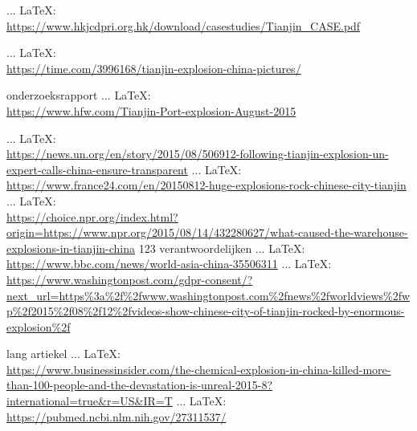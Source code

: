 \begin{thebibliography}{99}
     ... \LaTeX:\\ \url{https://www.hkjcdpri.org.hk/download/casestudies/Tianjin_CASE.pdf}

     ... \LaTeX:\\ \url{https://time.com/3996168/tianjin-explosion-china-pictures/}

    onderzoeksrapport
     ... \LaTeX:\\ \url{https://www.hfw.com/Tianjin-Port-explosion-August-2015}

     ... \LaTeX:\\ \url{https://news.un.org/en/story/2015/08/506912-following-tianjin-explosion-un-expert-calls-china-ensure-transparent}
     ... \LaTeX:\\ \url{https://www.france24.com/en/20150812-huge-explosions-rock-chinese-city-tianjin}
     ... \LaTeX:\\ \url{https://choice.npr.org/index.html?origin=https://www.npr.org/2015/08/14/432280627/what-caused-the-warehouse-explosions-in-tianjin-china}
    123 verantwoordelijken
     ... \LaTeX:\\ \url{https://www.bbc.com/news/world-asia-china-35506311}
     ... \LaTeX:\\ \url{https://www.washingtonpost.com/gdpr-consent/?next_url=https%3a%2f%2fwww.washingtonpost.com%2fnews%2fworldviews%2fwp%2f2015%2f08%2f12%2fvideos-show-chinese-city-of-tianjin-rocked-by-enormous-explosion%2f}

    lang artiekel
     ... \LaTeX:\\ \url{https://www.businessinsider.com/the-chemical-explosion-in-china-killed-more-than-100-people-and-the-devastation-is-unreal-2015-8?international=true&r=US&IR=T}
     ... \LaTeX:\\ \url{https://pubmed.ncbi.nlm.nih.gov/27311537/}


\end{thebibliography}
